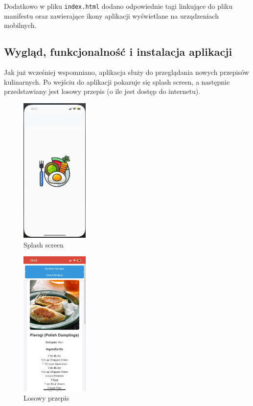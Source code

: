 \documentclass[a4paper,12pt]{article}
\begin{document}
Dodatkowo w pliku \texttt{index.html} dodano odpowiednie tagi linkujące do pliku manifestu oraz zawierające ikony aplikacji wyświetlane na urządzeniach mobilnych.

\subsection{Wygląd, funkcjonalność i instalacja aplikacji}

Jak już wcześniej wspomniano, aplikacja służy do przeglądania nowych przepisów kulinarnych. Po wejściu do aplikacji pokazuje się splash screen, a następnie przedstawiany jest
losowy przepis (o ile jest dostęp do internetu).

\begin{figure}[H]
    \centering
    \includegraphics[width=0.3\textwidth]{images/splash.jpg}
    \caption{Splash screen}
    \label{fig:splash}
\end{figure}

\begin{figure}[H]
    \centering
    \includegraphics[width=0.3\textwidth]{images/losowy.jpg}
    \caption{Losowy przepis}
    \label{fig:random}
\end{figure}
\end{document}
